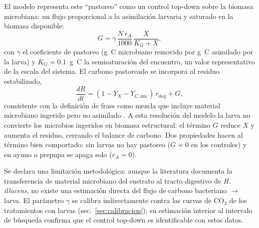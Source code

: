 El modelo representa este ``pastoreo'' como un control top-down sobre la biomasa microbiana: un flujo proporcional a la asimilaci\'on larvaria y saturado en la biomasa disponible:
\begin{equation}
  G = \gamma\,\frac{N\,r_A}{1000}\,\frac{X}{K_G + X},
  \label{eq:pastoreo}
\end{equation}
con $\gamma$ el coeficiente de pastoreo (g~C microbiano removido por g~C asimilado por la larva) y $K_G = 0.1$~g~C la semisaturaci\'on del encuentro, un valor representativo de la escala del sistema. El carbono pastoreado se incorpora al residuo estabilizado,
\begin{equation}
  \frac{dR}{dt} = (1 - Y_X - Y_{C,\mathrm{mic}})\,r_{\mathrm{deg}} + G,
  \label{eq:residuo}
\end{equation}
consistente con la definici\'on de frass como mezcla que incluye material microbiano ingerido pero no asimilado \parencite{pettengillEnvironmentalFrassRemodels2026}. A esta resoluci\'on del modelo la larva no convierte los microbios ingeridos en biomasa estructural: el t\'ermino $G$ reduce $X$ y aumenta el residuo, cerrando el balance de carbono. Dos propiedades hacen al t\'ermino bien comportado: sin larvas no hay pastoreo ($G = 0$ en los controles) y en ayuno o prepupa se apaga solo ($r_A = 0$).

Se declara una limitaci\'on metodol\'ogica: aunque la literatura documenta la transferencia de material microbiano del sustrato al tracto digestivo de \textit{H. illucens}, no existe una estimaci\'on directa del flujo de carbono bacteriano $\to$ larva. El par\'ametro $\gamma$ se calibra indirectamente contra las curvas de CO$_2$ de los tratamientos con larvas (sec.~\ref{sec:calibracion}); su estimaci\'on interior al intervalo de b\'usqueda confirma que el control top-down es identificable con estos datos.

